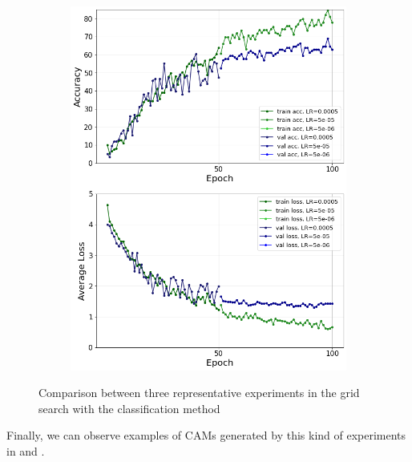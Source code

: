 \documentclass[10pt,twocolumn,hidelinks,letterpaper]{article}
\begin{document}
\begin{figure}
\begin{subfigure}{.325\linewidth}
  	\includegraphics[width=\linewidth]{images/grid_comparison/acc69lr5e-4step50100gamma01_no_reg.png}
  \end{subfigure}
  \caption{Comparison between three representative experiments in the grid search with the classification method\\}
  \label{grid_comparison}
\end{figure}

Finally, we can observe examples of CAMs generated by this kind of experiments in  and .
\end{document}
